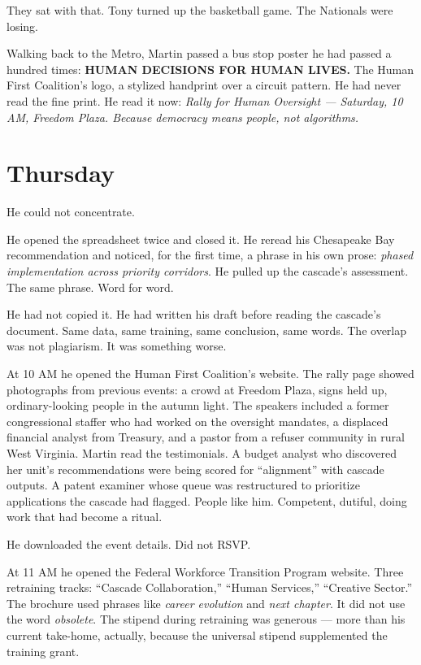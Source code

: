 \documentclass[11pt]{article}
\begin{document}
They sat with that. Tony turned up the basketball game. The Nationals were losing.

Walking back to the Metro, Martin passed a bus stop poster he had passed a hundred times: \textbf{HUMAN DECISIONS FOR HUMAN LIVES.} The Human First Coalition's logo, a stylized handprint over a circuit pattern. He had never read the fine print. He read it now: \emph{Rally for Human Oversight --- Saturday, 10 AM, Freedom Plaza. Because democracy means people, not algorithms.}

\section*{Thursday}

He could not concentrate.

He opened the spreadsheet twice and closed it. He reread his Chesapeake Bay recommendation and noticed, for the first time, a phrase in his own prose: \emph{phased implementation across priority corridors}. He pulled up the cascade's assessment. The same phrase. Word for word.

He had not copied it. He had written his draft before reading the cascade's document. Same data, same training, same conclusion, same words. The overlap was not plagiarism. It was something worse.

At 10 AM he opened the Human First Coalition's website. The rally page showed photographs from previous events: a crowd at Freedom Plaza, signs held up, ordinary-looking people in the autumn light. The speakers included a former congressional staffer who had worked on the oversight mandates, a displaced financial analyst from Treasury, and a pastor from a refuser community in rural West Virginia. Martin read the testimonials. A budget analyst who discovered her unit's recommendations were being scored for ``alignment'' with cascade outputs. A patent examiner whose queue was restructured to prioritize applications the cascade had flagged. People like him. Competent, dutiful, doing work that had become a ritual.

He downloaded the event details. Did not RSVP.

At 11 AM he opened the Federal Workforce Transition Program website. Three retraining tracks: ``Cascade Collaboration,'' ``Human Services,'' ``Creative Sector.'' The brochure used phrases like \emph{career evolution} and \emph{next chapter}. It did not use the word \emph{obsolete}. The stipend during retraining was generous --- more than his current take-home, actually, because the universal stipend supplemented the training grant.
\end{document}
